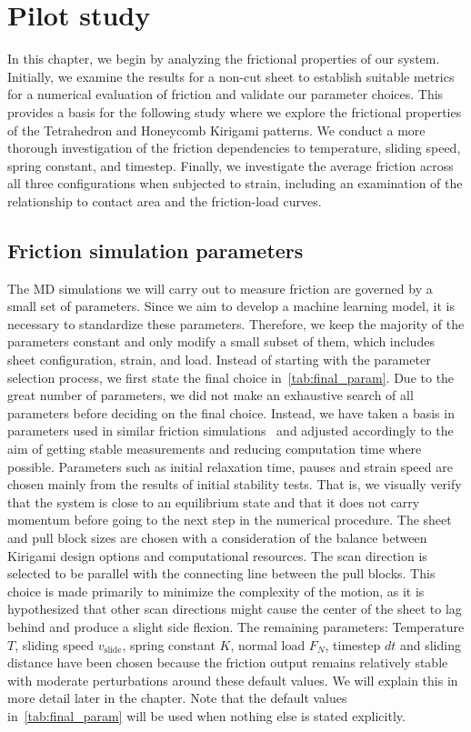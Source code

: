 \chapter{Pilot study}\label{chap:pilot_study}
In this chapter, we begin by analyzing the frictional properties of our system. Initially, we examine the results for a non-cut sheet to establish suitable metrics for a numerical evaluation of friction and validate our parameter choices. This provides a basis for the following study where we explore the frictional properties of the Tetrahedron and Honeycomb Kirigami patterns. We conduct a more thorough investigation of the friction dependencies to temperature, sliding speed, spring constant, and timestep. Finally, we investigate the average friction across all three configurations when subjected to strain, including an examination of the relationship to contact area and the friction-load curves.


\section{Friction simulation parameters}
The \acrshort{MD} simulations we will carry out to measure friction are governed
by a small set of parameters. Since we aim to develop a machine learning model,
it is necessary to standardize these parameters. Therefore, we keep the majority
of the parameters constant and only modify a small subset of them, which
includes sheet configuration, strain, and load. Instead of starting with the
parameter selection process, we first state the final choice
in~\cref{tab:final_param}. Due to the great number of parameters, we did not
make an exhaustive search of all parameters before deciding on the final choice.
Instead, we have taken a basis in parameters used in similar friction
simulations~\cite{li_evolving_2016, Yoon2015MolecularDS, liu_high-speed_2014,
zhu_study_2018, ma12091425} and adjusted accordingly to the aim of getting
stable measurements and reducing computation time where possible. Parameters
such as initial relaxation time, pauses and strain speed are chosen mainly from
the results of initial stability tests. That is, we visually verify that the
system is close to an equilibrium state and that it does not carry momentum
before going to the next step in the numerical procedure. The sheet and pull
block sizes are chosen with a consideration of the balance between Kirigami
design options and computational resources. The scan direction is selected to be
parallel with the connecting line between the pull blocks. This choice is made
primarily to minimize the complexity of the motion, as it is hypothesized that
other scan directions might cause the center of the sheet to lag behind and
produce a slight side flexion. The remaining
parameters: Temperature $T$, sliding speed $v_{\text{slide}}$, spring constant
$K$, normal load $F_N$, timestep $dt$ and sliding distance have been chosen
because the friction output remains relatively stable with moderate
perturbations around these default values. We will explain this in more detail
later in the chapter. Note that the default values in~\cref{tab:final_param}
will be used when nothing else is stated explicitly.


